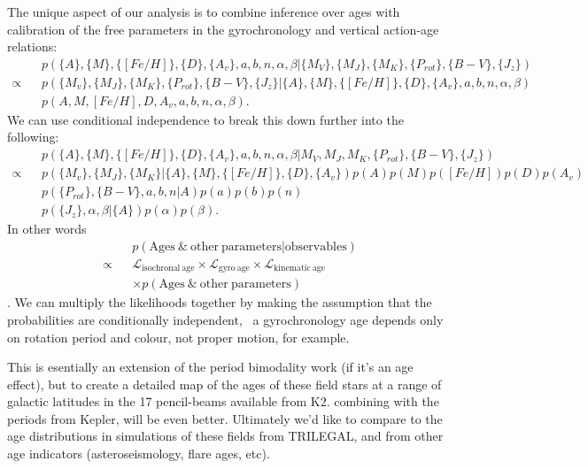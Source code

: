 \documentclass[12pt]{article}
\begin{document}
The unique aspect of our analysis is to combine inference over ages with
calibration of the free parameters in the gyrochronology and vertical
action-age relations:
\begin{eqnarray}
    &&p(\{A\}, \{M\}, \{[Fe/H]\}, \{D\}, \{A_v\}, a, b, n, \alpha, \beta|
    \{M_V\}, \{M_J\}, \{M_K\}, \{P_{rot}\}, \{B-V\}, \{J_z\}) \\ \nonumber
    \propto &&p(\{M_v\}, \{M_J\}, \{M_K\}, \{P_{rot}\},
    \{B-V\}, \{J_z\} | \{A\}, \{M\}, \{[Fe/H]\}, \{D\}, \{A_v\}, a, b, n,
    \alpha, \beta) \\ \nonumber
    &&p(A, M, [Fe/H], D, A_v, a, b, n, \alpha, \beta).
\end{eqnarray}
We can use conditional independence to break this down further into the
following:
\begin{eqnarray}
    &&p(\{A\}, \{M\}, \{[Fe/H]\}, \{D\}, \{A_v\}, a, b, n, \alpha, \beta|
    M_V, M_J, M_K,
    \{P_{rot}\}, \{B-V\}, \{J_z\}) \\  \nonumber
    \propto &&p(\{M_v\}, \{M_J\}, \{M_K\} | \{A\}, \{M\}, \{[Fe/H]\}, \{D\},
    \{A_v\})
    p(A)p(M)p([Fe/H])p(D)p(A_v) \\ \nonumber
    &&p(\{P_{rot}\}, \{B-V\}, a, b, n | A)p(a)p(b)p(n) \\ \nonumber
    &&p(\{J_z\}, \alpha, \beta | \{A\}) p(\alpha)p(\beta).
\end{eqnarray}
In other words
\begin{eqnarray}
    &&p(\mathrm{Ages~\&~other~parameters}|\mathrm{observables}) \\
    \propto &&\mathcal{L}_{\mathrm{isochronal~age}} \times
    \mathcal{L}_{\mathrm{gyro~age}} \times
    \mathcal{L}_{\mathrm{kinematic~age}} \\
    && \times p(\mathrm{Ages~\&~other~parameters})
\end{eqnarray}.
We can multiply the likelihoods together by making the assumption that the
probabilities are conditionally independent, \ie\ a gyrochronology age depends
only on rotation period and colour, not proper motion, for example.

This is esentially an extension of the period bimodality work (if it's an age
effect), but to create a detailed map of the ages of these field stars at a
range of galactic latitudes in the 17 pencil-beams available from K2.
combining with the periods from Kepler, will be even better.
Ultimately we'd like to compare to the age distributions in simulations of
these fields from TRILEGAL, and from other age indicators (asteroseismology,
flare ages, etc).
\end{document}

